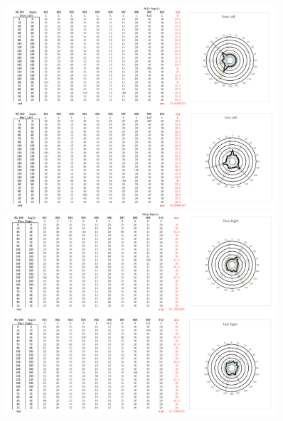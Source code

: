 \begin{figure}[h]
\centering
\includegraphics[width=0.9\textwidth,height=0.36\textheight]{A_thesis/appendix/Exp1_1-07.png}
\break
\break
\includegraphics[width=0.9\textwidth,height=0.36\textheight]{A_thesis/appendix/Exp1_1-08.png}
\end{figure}
\newpage

